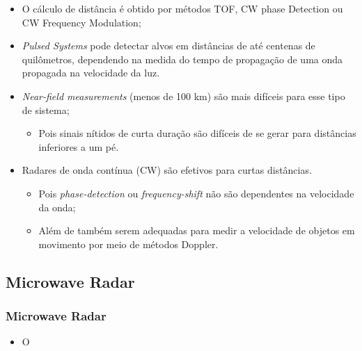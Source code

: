 \documentclass[xcolor=dvipsnames, aspectratio=169]{beamer}
\begin{document}
\begin{frame}
\begin{itemize}
    \newpage
    \item O cálculo de distância é obtido por métodos TOF, CW phase Detection ou CW Frequency Modulation;
    \item \textit{Pulsed Systems} pode detectar alvos em distâncias de até centenas de quilômetros, dependendo na medida do tempo de propagação de uma onda propagada na velocidade da luz.
    \item \textit{Near-field measurements} (menos de 100 km) são mais difíceis para esse tipo de sistema;
    \begin{itemize}
        \item Pois sinais nítidos de curta duração são difíceis de se gerar para distâncias inferiores a um pé.
    \end{itemize} 
    \item Radares de onda contínua (CW) são efetivos para curtas distâncias.
    \begin{itemize}
        \item Pois \textit{phase-detection} ou \textit{frequency-shift} não são dependentes na velocidade da onda;
        \item Além de também serem adequadas para medir a velocidade de objetos em movimento por meio de métodos Doppler.
    \end{itemize}
	\end{itemize}
	
\end{frame}


    \subsection[Introdução]{Microwave Radar} 
    \begin{frame}
    \frametitle{Microwave Radar}
        \begin{itemize}
            \item O
        \end{itemize}
    \end{frame}


\end{document}
